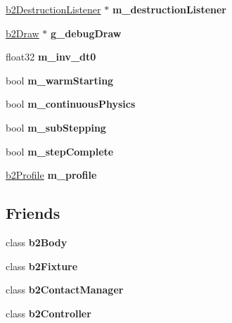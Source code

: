 \begin{DoxyCompactItemize}
\item 
\mbox{\label{classb2World_abf5abe16bd1ceef5ac15333042e71b4f}} 
\mbox{\hyperlink{classb2DestructionListener}{b2\+Destruction\+Listener}} $\ast$ {\bfseries m\+\_\+destruction\+Listener}
\item 
\mbox{\label{classb2World_a968f01f1ba41aa1d99324ffbde3a6b99}} 
\mbox{\hyperlink{classb2Draw}{b2\+Draw}} $\ast$ {\bfseries g\+\_\+debug\+Draw}
\item 
\mbox{\label{classb2World_aaac593d6db2b19c648202dc326f88ba4}} 
float32 {\bfseries m\+\_\+inv\+\_\+dt0}
\item 
\mbox{\label{classb2World_ab3c889781c1ad755f9f520f934e69b3d}} 
bool {\bfseries m\+\_\+warm\+Starting}
\item 
\mbox{\label{classb2World_a6546f4a56849f5635b4ed48f823be9e0}} 
bool {\bfseries m\+\_\+continuous\+Physics}
\item 
\mbox{\label{classb2World_abfdc124ba03185a4b15cf220ebbacfe6}} 
bool {\bfseries m\+\_\+sub\+Stepping}
\item 
\mbox{\label{classb2World_ad2a6027e3148f79d1a7598db3941d10a}} 
bool {\bfseries m\+\_\+step\+Complete}
\item 
\mbox{\label{classb2World_a482ca7842f3e26343fe3091848d1cf3c}} 
\mbox{\hyperlink{structb2Profile}{b2\+Profile}} {\bfseries m\+\_\+profile}
\end{DoxyCompactItemize}
\subsection*{Friends}
\begin{DoxyCompactItemize}
\item 
\mbox{\label{classb2World_a010ab52de250e5fe30a45d642f46405b}} 
class {\bfseries b2\+Body}
\item 
\mbox{\label{classb2World_afb35b0e61f6ee3cc516c40ea251f3236}} 
class {\bfseries b2\+Fixture}
\item 
\mbox{\label{classb2World_aece264d42f69aed410f5eb3beba6ddf2}} 
class {\bfseries b2\+Contact\+Manager}
\item 
\mbox{\label{classb2World_ad0171f9dac44cc7aae065c618c0d165b}} 
class {\bfseries b2\+Controller}
\end{DoxyCompactItemize}


